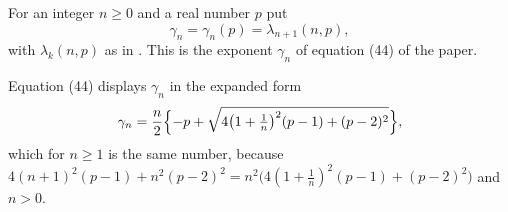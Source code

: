\begin{definition}
For an integer $n\ge0$ and a real number $p$ put
\[
  \gamma_n=\gamma_n(p)=\lambda_{n+1}(n,p),
\]
with $\lambda_k(n,p)$ as in .  This is the exponent
$\gamma_n$ of equation (44) of the paper.

Equation (44) displays $\gamma_n$ in the expanded form
\[
  \gamma_n=\frac n2\Bigl\{-p+\sqrt{4\bigl(1+\tfrac1n\bigr)^2(p-1)+(p-2)^2}\Bigr\},
\]
which for $n\ge1$ is the same number, because
$4(n+1)^2(p-1)+n^2(p-2)^2=n^2\bigl(4(1+\frac1n)^2(p-1)+(p-2)^2\bigr)$ and
$n>0$.
\end{definition}
